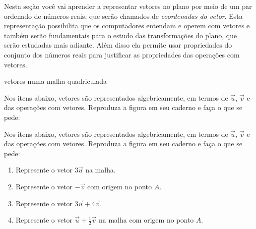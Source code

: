 \label{\detokenize{GE101-1:sec-vetores-algebrica}}\label{\detokenize{GE101-1:explorando-coordenadas-de-um-vetor}}\label{\detokenize{GE101-1::doc}}
Nesta seção você vai aprender a representar vetores no plano por meio de um par ordenado de números reais, que serão chamados de \textit{coordenadas do vetor}.
Esta representação possibilita que os computadores entendam e operem com vetores e também serão fundamentais para o estudo das transformações do plano, que serão estudadas mais adiante. Além disso ela permite usar propriedades do conjunto dos números reais para justificar as propriedades das operações com vetores.
\begin{task}{ vetores numa malha quadriculada}
\label{ativ-vetores-vetor-malha}


Nos itens abaixo, vetores são representados algebricamente, em termos de \(\vec{u}\), \(\vec{v}\) e das operações com vetores.
Reproduza a figura em seu caderno e faça o que se pede:

Nos itens abaixo, vetores são representados algebricamente, em termos de \(\vec{u}\), \(\vec{v}\) e das operações com vetores.
Reproduza a figura em seu caderno e faça o que se pede:
\begin{center}
\end{center}

\begin{enumerate}
\item {} 
Represente o vetor \(3\vec{u}\) na malha.

\item {} 
Represente o vetor \(-\vec{v}\) com origem no ponto \(A\).

\item {} 
Represente o vetor \(3\vec{u} + 4\vec{v}\).

\item {} 
Represente o vetor \(\vec{u}+\frac{1}{2}\vec{v}\) na malha com origem no ponto \(A\).

\end{enumerate}
\end{task}

